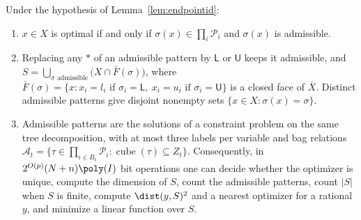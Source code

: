 \begin{corollary}\label{cor:facecsp}
Under the hypothesis of Lemma~\ref{lem:endpointid}:
\begin{enumerate}
\item[(i)] $x\in X$ is optimal if and only if $\sigma(x)\in\prod_i\mathcal P_i$
and $\sigma(x)$ is admissible.
\item[(ii)] Replacing any $\ast$ of an admissible pattern by $\mathsf L$ or
$\mathsf U$ keeps it admissible, and
$S=\bigcup_{\sigma\text{ admissible}}\bigl(X\cap\bar F(\sigma)\bigr)$, where
$\bar F(\sigma)=\{x:x_i=l_i\text{ if }\sigma_i=\mathsf L,\ x_i=u_i\text{ if }
\sigma_i=\mathsf U\}$ is a closed face of $\bar X$. Distinct admissible
patterns give disjoint nonempty sets $\{x\in X:\sigma(x)=\sigma\}$.
\item[(iii)] Admissible patterns are the solutions of a constraint problem on
the same tree decomposition, with at most three labels per variable and bag
relations
$\mathcal A_t=\{\tau\in\prod_{i\in B_t}\mathcal P_i:\operatorname{cube}(\tau)
\subseteq Z_t\}$. Consequently, in $2^{O(p)}(N+n)\poly(I)$ bit operations
one can decide whether the optimizer is unique, compute the dimension of $S$,
count the admissible patterns, count $|S|$ when $S$ is finite, compute
$\dist(y,S)^2$ and a nearest optimizer for a rational $y$, and minimize a
linear function over $S$.
\end{enumerate}
\end{corollary}

